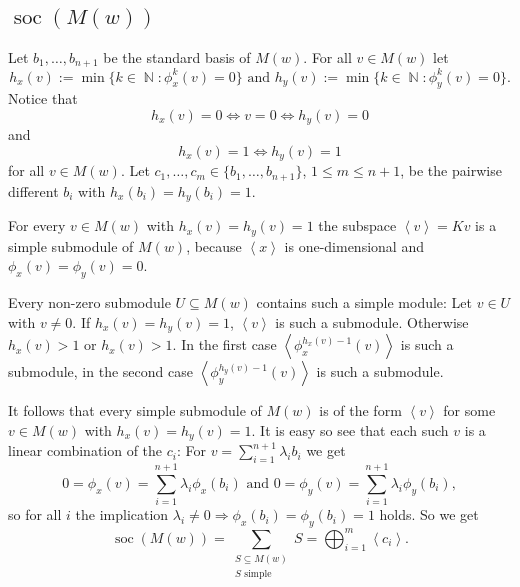 \documentclass[a4paper,10pt]{article}
\theoremstyle{definition}
\newcommand{\N}{\operatorname{\mathbb{N}}}
\newcommand{\soc}{\operatorname{soc}}
\newcommand{\gen}[1]{\left\langle#1\right\rangle}
\begin{document}
\section{}


\subsection*{$\soc(M(w))$}
Let $b_1, \ldots, b_{n+1}$ be the standard basis of $M(w)$. For all $v \in M(w)$ let
\[
 h_x(v) := \min \{k \in \N : \phi^k_x(v) = 0\} \text{ and }
 h_y(v) := \min \{k \in \N : \phi^k_y(v) = 0\}.
\]
Notice that
\[
 h_x(v) = 0 \Leftrightarrow v = 0 \Leftrightarrow h_y(v) = 0
\]
and
\[
 h_x(v) = 1 \Leftrightarrow h_y(v) = 1
\]
for all $v \in M(w)$.
Let $c_1, \ldots, c_m \in \{b_1, \ldots, b_{n+1}\}$, $1 \leq m \leq n+1$, be the pairwise different $b_i$ with $h_x(b_i) = h_y(b_i) = 1$.

For every $v \in M(w)$ with $h_x(v) = h_y(v) = 1$ the subspace $\gen{v} = K v$ is a simple submodule of $M(w)$, because $\gen{x}$ is one-dimensional and $\phi_x(v) = \phi_y(v) = 0$.

Every non-zero submodule $U \subseteq M(w)$ contains such a simple module: Let $v \in U$ with $v \neq 0$. If $h_x(v) = h_y(v) = 1$, $\gen{v}$ is such a submodule. Otherwise $h_x(v) > 1$ or $h_x(v) > 1$. In the first case $\gen{\phi^{h_x(v)-1}_x(v)}$ is such a submodule, in the second case $\gen{\phi^{h_y(v)-1}_y(v)}$ is such a submodule.

It follows that every simple submodule of $M(w)$ is of the form $\gen{v}$ for some $v \in M(w)$ with $h_x(v) = h_y(v) = 1$. It is easy so see that each such $v$ is a linear combination of the $c_i$: For $v = \sum_{i=1}^{n+1} \lambda_i b_i$ we get
\[
 0 = \phi_x(v) = \sum_{i=1}^{n+1} \lambda_i \phi_x(b_i)
 \text{ and }
 0 = \phi_y(v) = \sum_{i=1}^{n+1} \lambda_i \phi_y(b_i),
\]
so for all $i$ the implication $\lambda_i \neq 0 \Rightarrow \phi_x(b_i) = \phi_y(b_i) = 1$ holds. So we get
\[
 \soc(M(w))
 = \sum_{\substack{S \subseteq M(w) \\ S \text{ simple}}} S
 = \bigoplus_{i=1}^m \gen{c_i}.
\]
\end{document}
